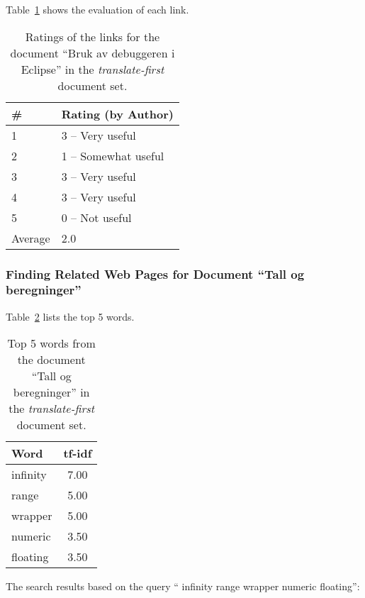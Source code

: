 Table~\ref{tab:ratings-en-bruk-av-debuggeren-i-eclipse} shows the evaluation of each link.
\begin{table}[H]
\centering
\begin{tabular}{|l|l|}
\hline\hline
    \# & Rating (by Author) \\
\hline
    1 & 3 -- Very useful \\
    2 & 1 -- Somewhat useful \\
    3 & 3 -- Very useful \\
    4 & 3 -- Very useful \\
    5 & 0 -- Not useful \\
\hline
    Average & 2.0 \\
\hline\hline
\end{tabular}
\caption{Ratings of the links for the document ``Bruk av debuggeren i Eclipse'' in the \textit{translate-first} document set.}
\label{tab:ratings-en-bruk-av-debuggeren-i-eclipse}
\end{table}


\subsubsection{Finding Related Web Pages for Document ``Tall og beregninger''}
\label{subsubsec:en-tall-og-beregninger}

Table~\ref{tab:topWords-en-tall-og-beregninger} lists the top 5 words.
\begin{table}[H]
\centering
\begin{tabular}{|l|c|}
\hline\hline
    Word & tf-idf \\
\hline
    infinity & 7.00 \\
    range & 5.00 \\
    wrapper & 5.00 \\
    numeric & 3.50 \\
    floating & 3.50 \\
\hline\hline
\end{tabular}
\caption{Top 5 words from the document ``Tall og beregninger'' in the \textit{translate-first} document set.}
\label{tab:topWords-en-tall-og-beregninger}
\end{table}

The search results based on the query `` infinity range wrapper numeric floating'':

